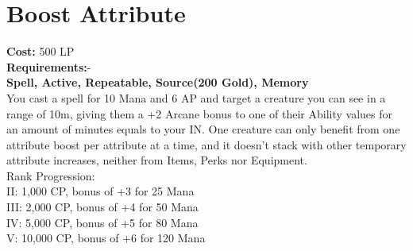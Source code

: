 \section{Boost Attribute}\label{spell:boostAttribute}
\textbf{Cost:} 500 LP\\
\textbf{Requirements:}-\\
\textbf{Spell, Active, Repeatable, Source(200 Gold), Memory}\\
You cast a spell for 10 Mana and 6 AP and target a creature you can see in a range of 10m, giving them a +2 Arcane bonus to one of their Ability values for an amount of minutes equals to your IN.
One creature can only benefit from one attribute boost per attribute at a time, and it doesn't stack with other temporary attribute increases, neither from Items, Perks nor Equipment.
\\
Rank Progression:\\
II: 1,000 CP, bonus of +3 for 25 Mana\\
III: 2,000 CP, bonus of +4 for 50 Mana\\
IV: 5,000 CP, bonus of +5 for 80 Mana\\
V: 10,000 CP, bonus of +6 for 120 Mana\\